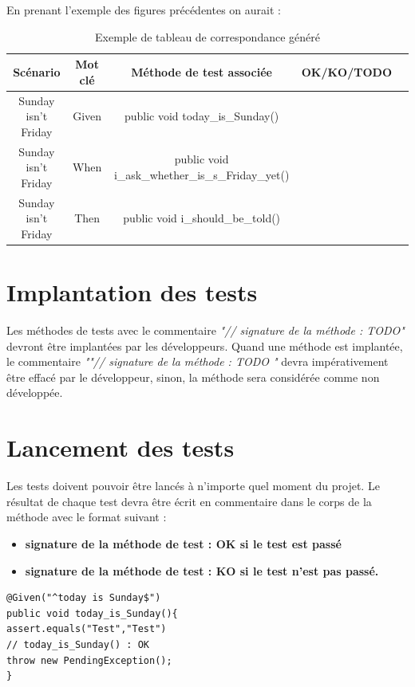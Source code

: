 En prenant l'exemple des figures précédentes on aurait :

      \begin{table}[H]
        \centering
         \begin{tabular}{|c|c|c|c|c|} 
         \hline
        Scénario & Mot clé & Méthode de test associée & OK/KO/TODO \\ [0.5ex] 
         \hline
          Sunday isn't Friday & Given & public void today\_is\_Sunday() & \\
         \hline
         Sunday isn't Friday & When &  public void i\_ask\_whether\_is\_s\_Friday\_yet() & \\
         \hline
         Sunday isn't Friday & Then & public void i\_should\_be\_told()& \\
         \hline
        \end{tabular}
        \caption{Exemple de tableau de correspondance généré}
        \label{ref:correspondance}
        \end{table}
    
\section{Implantation des tests}

Les méthodes de tests avec le commentaire \textit{"\textcolor{dkgreen}{// signature de la méthode : TODO}"} devront être implantées par les développeurs. Quand une méthode est implantée, le commentaire \textit{"\textcolor{dkgreen}{"// signature de la méthode : TODO "} }devra impérativement être effacé par le développeur, sinon, la méthode sera considérée comme non développée. 

\section{Lancement des tests}

Les tests doivent pouvoir être lancés à n'importe quel moment du projet. Le résultat de chaque test devra être écrit en commentaire dans le corps de la méthode avec le format suivant : 
\begin{itemize}
    \item\textbf{signature de la méthode de test : OK si le test est passé }
    \item\textbf{signature de la méthode de test : KO si le test n'est pas passé.}
\end{itemize}


\begin{lstlisting}
@Given("^today is Sunday$")
public void today_is_Sunday(){
assert.equals("Test","Test")
// today_is_Sunday() : OK
throw new PendingException();
}
\end{lstlisting}


